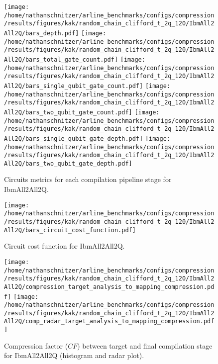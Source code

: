 \documentclass{report}%
\begin{document}
\begin{figure}[h!]%
\centering%
\texttt{[image: /home/nathanschnitzer/arline\_benchmarks/configs/compression/results/figures/kak/random\_chain\_clifford\_t\_2q\_120/IbmAll2All2Q/bars\_depth.pdf]}%
\centering%
\texttt{[image: /home/nathanschnitzer/arline\_benchmarks/configs/compression/results/figures/kak/random\_chain\_clifford\_t\_2q\_120/IbmAll2All2Q/bars\_total\_gate\_count.pdf]}%
\linebreak%
\centering%
\texttt{[image: /home/nathanschnitzer/arline\_benchmarks/configs/compression/results/figures/kak/random\_chain\_clifford\_t\_2q\_120/IbmAll2All2Q/bars\_single\_qubit\_gate\_count.pdf]}%
\centering%
\texttt{[image: /home/nathanschnitzer/arline\_benchmarks/configs/compression/results/figures/kak/random\_chain\_clifford\_t\_2q\_120/IbmAll2All2Q/bars\_two\_qubit\_gate\_count.pdf]}%
\linebreak%
\centering%
\texttt{[image: /home/nathanschnitzer/arline\_benchmarks/configs/compression/results/figures/kak/random\_chain\_clifford\_t\_2q\_120/IbmAll2All2Q/bars\_single\_qubit\_gate\_depth.pdf]}%
\centering%
\texttt{[image: /home/nathanschnitzer/arline\_benchmarks/configs/compression/results/figures/kak/random\_chain\_clifford\_t\_2q\_120/IbmAll2All2Q/bars\_two\_qubit\_gate\_depth.pdf]}%
\linebreak%
\caption{Circuits metrics for each compilation pipeline stage for IbmAll2All2Q.}%
\end{figure}

%


\begin{figure}[h!]%
\centering%
\texttt{[image: /home/nathanschnitzer/arline\_benchmarks/configs/compression/results/figures/kak/random\_chain\_clifford\_t\_2q\_120/IbmAll2All2Q/bars\_circuit\_cost\_function.pdf]}%
\caption{Circuit cost function for IbmAll2All2Q.}%
\end{figure}

%


\begin{figure}[h!]%
\centering%
\texttt{[image: /home/nathanschnitzer/arline\_benchmarks/configs/compression/results/figures/kak/random\_chain\_clifford\_t\_2q\_120/IbmAll2All2Q/compression\_target\_analysis\_to\_mapping\_compression.pdf]}%
\centering%
\texttt{[image: /home/nathanschnitzer/arline\_benchmarks/configs/compression/results/figures/kak/random\_chain\_clifford\_t\_2q\_120/IbmAll2All2Q/comp\_radar\_target\_analysis\_to\_mapping\_compression.pdf]}%
\caption{Compression factor ($CF$) between target and final compilation stage for IbmAll2All2Q
                        (histogram and radar plot).
                        }%
\end{figure}
\end{document}
